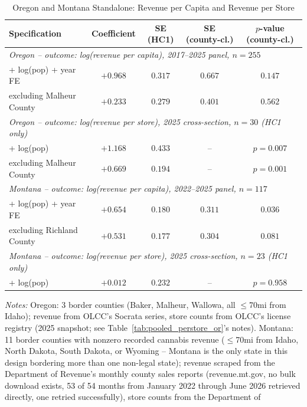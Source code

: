 \begin{table}[htbp]
\centering
\caption{Oregon and Montana Standalone: Revenue per Capita and Revenue per Store}
\label{tab:or_mt_standalone}
\begin{tabular}{lcccc}
\toprule
Specification & Coefficient & SE (HC1) & SE (county-cl.) & $p$-value (county-cl.) \\
\midrule
\multicolumn{5}{l}{\textit{Oregon -- outcome: log(revenue per capita), 2017--2025 panel, $n=255$}} \\
+ log(pop) + year FE & $+0.968$ & $0.317$ & $0.667$ & $0.147$ \\
\quad excluding Malheur County & $+0.233$ & $0.279$ & $0.401$ & $0.562$ \\
\midrule
\multicolumn{5}{l}{\textit{Oregon -- outcome: log(revenue per store), 2025 cross-section, $n=30$ (HC1 only)}} \\
+ log(pop) & $+1.168$ & $0.433$ & -- & $p=0.007$ \\
\quad excluding Malheur County & $+0.669$ & $0.194$ & -- & $p=0.001$ \\
\midrule
\multicolumn{5}{l}{\textit{Montana -- outcome: log(revenue per capita), 2022--2025 panel, $n=117$}} \\
+ log(pop) + year FE & $+0.654$ & $0.180$ & $0.311$ & $0.036$ \\
\quad excluding Richland County & $+0.531$ & $0.177$ & $0.304$ & $0.081$ \\
\midrule
\multicolumn{5}{l}{\textit{Montana -- outcome: log(revenue per store), 2025 cross-section, $n=23$ (HC1 only)}} \\
+ log(pop) & $+0.012$ & $0.232$ & -- & $p=0.958$ \\
\bottomrule
\end{tabular}
\begin{minipage}{0.95\textwidth}
\vspace{0.3em}
\footnotesize
\textit{Notes:} Oregon: 3 border counties (Baker, Malheur, Wallowa, all $\leq$70mi from Idaho); revenue
from OLCC's Socrata series, store counts from OLCC's license registry (2025 snapshot; see
Table~\ref{tab:pooled_perstore_or}'s notes). Montana: 11 border counties with nonzero recorded cannabis
revenue ($\leq$70mi from Idaho, North Dakota, South Dakota, or Wyoming -- Montana is the only state in
this design bordering more than one non-legal state); revenue scraped from the Department of Revenue's
monthly county sales reports (revenue.mt.gov, no bulk download exists, 53 of 54 months from January 2022
through June 2026 retrieved directly, one retried successfully), store counts from the Department of

\end{minipage}
\end{table}
